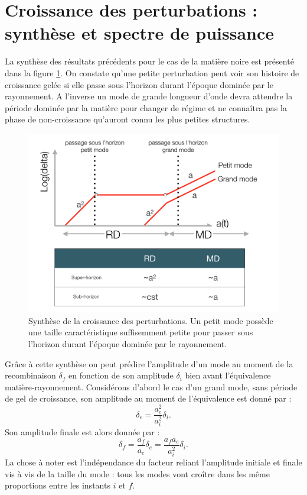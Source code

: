 \section{Croissance des perturbations : synthèse et spectre de puissance}

La synthèse des résultats précédents pour le cas de la matière noire est présenté dans la figure \ref{f:perturb}. On constate qu'une petite perturbation peut voir son histoire de croissance gelée si elle passe sous l'horizon durant l'époque dominée par le rayonnement. A l'inverse un mode de grande longueur d'onde devra attendre la période dominée par la matière pour changer de régime et ne connaîtra pas la phase de non-croissance qu'auront connu les plus petites structures.

\begin{figure}[htbp]
	\centering
		\includegraphics[height=8cm]{figs/perturb.png}
		\caption[Synthèse de la croissance des perturbations]{Synthèse de la croissance des perturbations. Un petit mode possède une taille caractéristique suffisemment petite pour passer sous l'horizon durant l'époque dominée par le rayonnement.}
	\label{f:perturb}
\end{figure}

Grâce à cette synthèse on peut prédire l'amplitude d'un mode au moment de la recombinaison $\delta_f$ en fonction de son amplitude $\delta_i$ bien avant l'équivalence matière-rayonnement. Considérons d'abord le cas d'un grand mode, sans période de gel de croissance, son amplitude au moment de l'équivalence est donné par :
\begin{equation}
\delta_e=\frac{a_e^2}{a_i^2}\delta_i.
\end{equation}
Son amplitude finale est alors donnée par :
\begin{equation}
\delta_f=\frac{a_f}{a_e}\delta_e=\frac{a_f a_e}{a_i^2}\delta_i.
\end{equation}
La chose à noter est l'indépendance du facteur reliant l'amplitude initiale et finale vis à vis de la taille du mode : tous les modes vont croître dans les même proportions entre les instants $i$ et $f$. 

